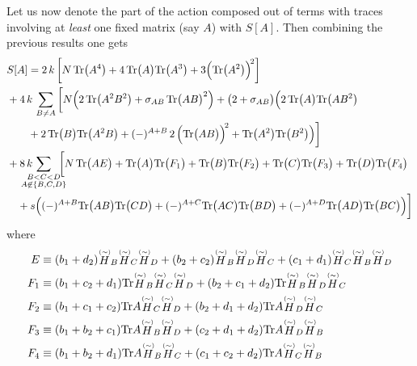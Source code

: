 \documentclass[10pt,a4paper]{article}
\newcommand\ptwid[1]{\mathord{\mathop{#1}\limits^{\scriptscriptstyle(\sim)}}}
\newcommand{\Tr}{\mathrm{Tr}\vspace{-2pt}}
\begin{document}
Let us now denote the part of the action composed out of terms with traces
involving at \textit{least} one fixed matrix (say $A$) with $S[A]$.
Then combining the previous results one gets
\begin{align}
  &S[A] =
  2 \, k \,
  \bigg[
      N \, \Tr \big( A^4 \big)
    + 4 \, \Tr \big( A \big) \Tr \big( A^3 \big)
    + 3 \Big( \Tr \big( A^2 \big) \Big)^{\! 2}
  \bigg]
  \nonumber \\
  &+ 4 \, k \,
  \sum_{B \neq A}
  \bigg[
    N
    \Big(
      2 \, \Tr \big( A^2 B^2 \big)
      + \sigma_{AB} \, \Tr \big( A B \big)^2
    \Big)
    + \big( 2 + \sigma_{AB} \big)
    \Big(
      2 \, \Tr \big( A \big) \Tr \big( A B^2 \big)
      \nonumber \\
      &\qquad+ 2 \,  \Tr \big( B \big) \Tr \big( A^2 B \big)
      + (-)^{A+B} \, 2 \, \Big( \Tr \big( A B \big) \Big)^{\! 2}
      + \Tr \big( A^2 \big) \Tr \big( B^2 \big)
    \Big)
  \bigg]
  \nonumber \\
  &+ 8 \, k \,
  \sum_{\mathclap{\substack{B < C < D\\A \not \in \{B,C,D\} }}}
  \;\;
  \bigg[
    N \, \Tr \big( A E \big) +
    \Tr \big( A \big) \Tr \big ( F_1 \big) +
    \Tr \big( B \big) \Tr \big ( F_2 \big) +
    \Tr \big( C \big) \Tr \big ( F_3 \big) +
    \Tr \big( D \big) \Tr \big ( F_4 \big)
    \nonumber \\
    &\quad+
    s \Big(
        (-)^{A+B} \Tr \big( A B \big) \Tr \big( C D \big)
      + (-)^{A+C} \Tr \big( A C \big) \Tr \big( B D \big)
      + (-)^{A+D} \Tr \big( A D \big) \Tr \big( B C \big)
    \Big)
  \bigg]
\end{align}
where
\begin{align}
  E &\equiv
  (b_1 + d_2) \ptwid H_B \ptwid H_C \ptwid H_D +
  (b_2 + c_2) \ptwid H_B \ptwid H_D \ptwid H_C +
  (c_1 + d_1) \ptwid H_C \ptwid H_B \ptwid H_D \\
  F_1 &\equiv
    (b_1+c_2+d_1) \Tr \ptwid H_B \ptwid H_C \ptwid H_D +
    (b_2+c_1+d_2) \Tr \ptwid H_B \ptwid H_D \ptwid H_C \\
  F_2 &\equiv
    (b_1+c_1+c_2) \Tr A \ptwid H_C \ptwid H_D +
    (b_2+d_1+d_2) \Tr A \ptwid H_D \ptwid H_C \\
  F_3 &\equiv
    (b_1+b_2+c_1) \Tr A \ptwid H_B \ptwid H_D +
    (c_2+d_1+d_2) \Tr A \ptwid H_D \ptwid H_B \\
  F_4 &\equiv
    (b_1+b_2+d_1) \Tr A \ptwid H_B \ptwid H_C +
    (c_1+c_2+d_2) \Tr A \ptwid H_C \ptwid H_B
\end{align}
\end{document}
